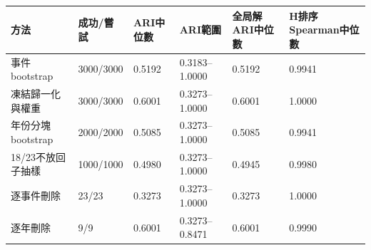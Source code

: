 \begin{tabular}{llllll}
\hline
方法 & 成功/嘗試 & ARI中位數 & ARI範圍 & 全局解ARI中位數 & H排序Spearman中位數 \\
\hline
事件bootstrap & 3000/3000 & 0.5192 & 0.3183–1.0000 & 0.5192 & 0.9941 \\
凍結歸一化與權重 & 3000/3000 & 0.6001 & 0.3273–1.0000 & 0.6001 & 1.0000 \\
年份分塊bootstrap & 2000/2000 & 0.5085 & 0.3273–1.0000 & 0.5085 & 0.9941 \\
18/23不放回子抽樣 & 1000/1000 & 0.4980 & 0.3273–1.0000 & 0.4945 & 0.9980 \\
逐事件刪除 & 23/23 & 0.3273 & 0.3273–1.0000 & 0.3273 & 1.0000 \\
逐年刪除 & 9/9 & 0.6001 & 0.3273–0.8471 & 0.6001 & 0.9990 \\
\hline
\end{tabular}